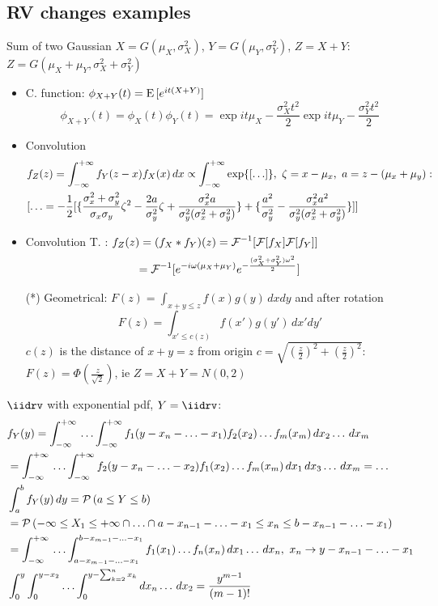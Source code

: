 \documentclass[asd-beamer.tex]{subfiles}%
\begin{document}
\subsection{RV changes examples}

\begin{frame}{Sum of two Gaussian}
$X=G(\mu_X,\sigma_X^2)$, $Y=G(\mu_Y,\sigma_Y^2)$, $Z=X+Y$: $Z=G(\mu_X+\mu_Y,\sigma_X^2+\sigma_Y^2)$
\begin{itemize}
\item C. function: $\phi_{X+Y}(t)=\operatorname{E}{[e^{it(X+Y)}]}$
\[\phi_{X+Y}(t)=\phi_X(t)\phi_Y(t)=\exp{it\mu_X-\frac{\sigma_X^2t^2}{2}}\exp{it\mu_Y-\frac{\sigma_Y^2t^2}{2}}\]
\item Convolution
\begin{align*}
&f_Z(z)=\int_{-\infty}^{+\infty}{}f_Y(z-x)f_X(x)\,dx\propto\int_{-\infty}^{+\infty}{}\text{exp}\{[\ldots]\},\ \zeta=x-\mu_x,\ a=z-(\mu_x+\mu_y):\\ &[\ldots=-\frac{1}{2}[\{\frac{\sigma_x^2+\sigma_y^2}{\sigma_x\sigma_y}\zeta^2-\frac{2a}{\sigma_y^2}\zeta+\frac{\sigma_x^2a}{\sigma_y^2(\sigma_x^2+\sigma_y^2)}\}+\{\frac{a^2}{\sigma_y^2}-\frac{\sigma_x^2a^2}{\sigma_y^2(\sigma_x^2+\sigma_y^2)}\}]]
\end{align*}
\item Convolution T. : $f_Z(z)=(f_X*f_Y)(z)={\mathcal{F}{}}^{-1}[\mathcal{F}{[f_X]}\mathcal{F}{[f_Y]}]$
\[={\mathcal{F}{}}^{-1}[e^{-i\omega(\mu_X+\mu_Y)}e^{-\frac{(\sigma_X^2+\sigma_Y^2)\omega^2}{2}}]\]
\item[(*)] Geometrical: $F(z)=\int_{x+y\leq z}f(x)g(y)\,dxdy$ and after rotation
\[F(z)=\int_{x'\leq c(z)}f(x')g(y')\,dx'dy'\]
$c(z)$ is the distance of $x+y=z$ from origin $c=\sqrt{(\frac{z}{2})^2+(\frac{z}{2})^2}$: $F(z)=\Phi(\frac{z}{\sqrt{2}})$, ie $Z=X+Y=N(0,2)$
\end{itemize}
\end{frame}

\begin{wordonframe}{}
$\iidrv$ with exponential pdf, $Y=\iidrv$:
\begin{align*}
&f_Y(y)=\int_{-\infty}^{+\infty}{}\ldots\int_{-\infty}^{+\infty} f_1(y-x_n-\ldots-x_1)f_2(x_2)\ldots f_m(x_m)\,dx_2\ldots\,dx_m\\
&=\int_{-\infty}^{+\infty}{}\ldots\int_{-\infty}^{+\infty} f_2(y-x_n-\ldots-x_2)f_1(x_2)\ldots f_m(x_m)\,dx_1\,dx_3\ldots\,dx_m=\ldots\\
&\int_a^bf_Y(y)\,dy=\operatorname{\mathcal{P}}{(a\leq Y\leq b)}\\
&=\operatorname{\mathcal{P}}{(-\infty\leq X_1\leq+\infty\cap\ldots\cap a-x_{n-1}-\ldots-x_1\leq x_n\leq b-x_{n-1}-\ldots-x_1)}\\
&=\int_{-\infty}^{+\infty}{}\ldots\int_{a-x_{m-1}-\ldots-x_1}^{b-x_{m-1}-\ldots-x_1}f_1(x_1)\ldots f_n(x_n)\,dx_1\ldots\,dx_n,\ x_n\to y-x_{n-1}-\ldots-x_1\\
&\int_0^y\int_0^{y-x_2}\ldots\int_0^{y-\sum_{k=2}^nx_k}dx_n\ldots\,dx_{2}=\frac{y^{m-1}}{(m-1)!}
\end{align*}
\end{wordonframe}
\end{document}
